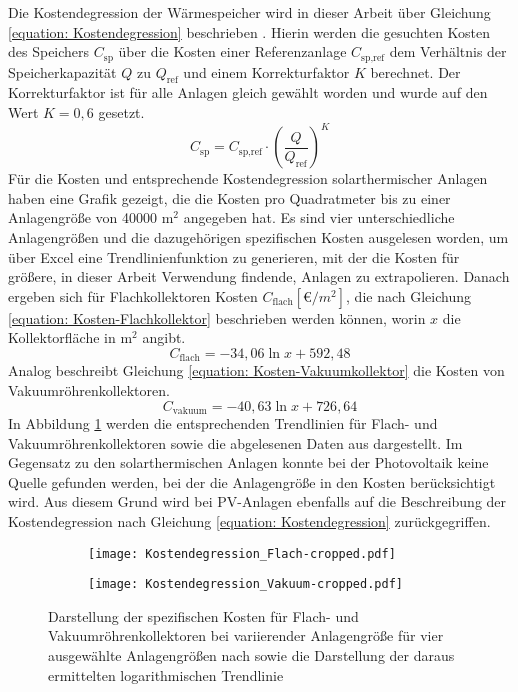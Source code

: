 Die Kostendegression der Wärmespeicher wird in dieser Arbeit über Gleichung \ref{equation: Kostendegression} beschrieben \cite{dietrich2017}. Hierin werden die gesuchten Kosten des Speichers $C_\text{sp}$ über die Kosten einer Referenzanlage $C_\text{sp,ref}$ dem Verhältnis der Speicherkapazität $Q$ zu $Q_\text{ref}$ und einem Korrekturfaktor $K$ berechnet. Der Korrekturfaktor ist für alle Anlagen gleich gewählt worden und wurde auf den Wert $K = 0,6$ gesetzt.
	\begin{equation}\label{equation: Kostendegression}
		C_\text{sp} = C_\text{sp,ref} \cdot \left(\dfrac{Q}{Q_\text{ref}}\right)^K
	\end{equation}
Für die Kosten und entsprechende Kostendegression solarthermischer Anlagen haben \citet{Waermenetz40} eine Grafik gezeigt, die die Kosten pro Quadratmeter bis zu einer Anlagengröße von 40000 $\text{m}^2$ angegeben hat. Es sind vier unterschiedliche Anlagengrößen und die dazugehörigen spezifischen Kosten ausgelesen worden, um über Excel eine Trendlinienfunktion zu generieren, mit der die Kosten für größere, in dieser Arbeit Verwendung findende, Anlagen zu extrapolieren. Danach ergeben sich für Flachkollektoren Kosten $C_\text{flach} [\euro{}/m^2]$, die nach Gleichung \ref{equation: Kosten-Flachkollektor} beschrieben werden können, worin $x$ die Kollektorfläche in m$^2$ angibt.
	\begin{equation}\label{equation: Kosten-Flachkollektor}
		C_\text{flach} = -34,06 \ln x + 592,48
	\end{equation} 
Analog beschreibt Gleichung \ref{equation: Kosten-Vakuumkollektor} die Kosten von Vakuumröhrenkollektoren.
	\begin{equation}\label{equation: Kosten-Vakuumkollektor}
		C_\text{vakuum} = -40,63 \ln x + 726,64
	\end{equation}
In Abbildung \ref{fig: Kostendegression Solar} werden die entsprechenden Trendlinien für Flach- und Vakuumröhrenkollektoren sowie die abgelesenen Daten aus \cite{Waermenetz40} dargestellt. Im Gegensatz zu den solarthermischen Anlagen konnte bei der Photovoltaik keine Quelle gefunden werden, bei der die Anlagengröße in den Kosten berücksichtigt wird. Aus diesem Grund wird bei \ac{PV}-Anlagen ebenfalls auf die Beschreibung der Kostendegression nach Gleichung \ref{equation: Kostendegression} zurückgegriffen. 	
	\begin{figure}
		\begin{subfigure}[b]{0.49\textwidth}
			\texttt{[image: Kostendegression\_Flach-cropped.pdf]}
		\end{subfigure}
		\begin{subfigure}[b]{0.49\textwidth}
			\texttt{[image: Kostendegression\_Vakuum-cropped.pdf]}
		\end{subfigure}
		\caption[Darstellung der spezifischen Kosten für Flach- und Vakuumröhrenkollektoren]{Darstellung der spezifischen Kosten für Flach- und Vakuumröhrenkollektoren bei variierender Anlagengröße für vier ausgewählte Anlagengrößen nach \citet{Waermenetz40} sowie die Darstellung der daraus ermittelten logarithmischen Trendlinie}
		\label{fig: Kostendegression Solar}
	\end{figure}

